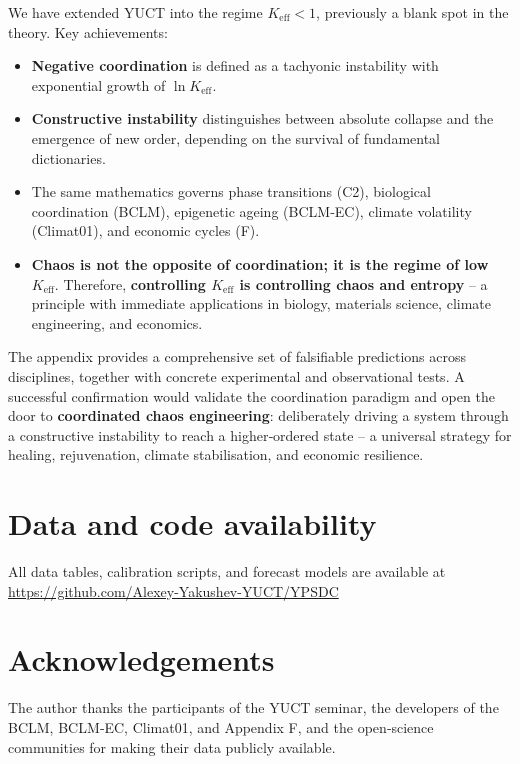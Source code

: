 \documentclass[12pt,a4paper]{article}
\newcommand{\Keff}{K_{\mathrm{eff}}}
\begin{document}
	We have extended YUCT into the regime $\Keff < 1$, previously a blank spot in the
	theory. Key achievements:
	
	\begin{itemize}
		\item \textbf{Negative coordination} is defined as a tachyonic instability with
		exponential growth of $\ln \Keff$.
		\item \textbf{Constructive instability} distinguishes between absolute collapse
		and the emergence of new order, depending on the survival of fundamental dictionaries.
		\item The same mathematics governs phase transitions (C2), biological coordination
		(BCLM), epigenetic ageing (BCLM‑EC), climate volatility (Climat01), and economic
		cycles (F).
		\item \textbf{Chaos is not the opposite of coordination; it is the regime of low
			$\Keff$}. Therefore, \textbf{controlling $\Keff$ is controlling chaos and entropy} –
		a principle with immediate applications in biology, materials science, climate
		engineering, and economics.
	\end{itemize}
	
	The appendix provides a comprehensive set of falsifiable predictions across
	disciplines, together with concrete experimental and observational tests.
	A successful confirmation would validate the coordination paradigm and open the
	door to \textbf{coordinated chaos engineering}: deliberately driving a system
	through a constructive instability to reach a higher‑ordered state – a universal
	strategy for healing, rejuvenation, climate stabilisation, and economic resilience.
	
	\section*{Data and code availability}
	
	All data tables, calibration scripts, and forecast models are available at
	\url{https://github.com/Alexey-Yakushev-YUCT/YPSDC}
	
	\section*{Acknowledgements}
	
	The author thanks the participants of the YUCT seminar, the developers of
	the BCLM, BCLM‑EC, Climat01, and Appendix F, and the open‑science communities
	for making their data publicly available.
	
\end{document}

